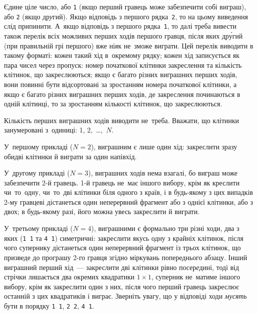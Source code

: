 \OutputFile

Єдине ціле число, або \texttt{1} (якщо перший гравець може забезпечити собі виграш), або \texttt{2} (якщо др{\it у}гий).
Якщо відповідь з першого рядка~\texttt{2}, то на цьому виведення слід припинити. А~якщо відповідь з першого рядка~\texttt{1}, то далі треба вивести також перелік всіх можливих перших ходів першого гравця, після яких др\'{у}гий (при правильній грі першого) вже ні{\it я}к не~зможе виграти. Цей перелік виводити в такому форматі: кожен такий хід в~окремому рядку; кожен хід записується як пара чисел через пропуск: номер початкової клітинки закреслення та кількість клітинок, що закреслюються; якщо є багато різних виграшних перших ходів, вони повинні бути відсортовані за зростанням номера початкової клітинки, а якщо є багато різних виграшних перших ходів, де закреслення починаються в одній клітинці, то за зростанням кількості клітинок, що закреслюються.

Кількість перших виграшних ходів виводити не~треба.
Вважати, що клітинки занумеровані з~одиниці: 1, 2,~\dots,~$N$.


\Examples

\begin{example}
\end{example}


\Note

У~першому прикладі ($N{=}2$), виграшним є лише один хід: закреслити зразу обидві клітинки й виграти за один напівхід.

У~др{\it у}гому прикладі ($N{=}3$), виграшних ходів нема взагалі, бо виграш може забезпечити 2-й гравець. 1-й гравець не~має іншого вибору, крім як креслити чи~то~одну, чи~то~дві клітинки біля одного з країв, і в будь-якому з цих випадків 2-му гравцеві дістанеться один неперервний фрагмент або з однієї клітинки, або з двох; в будь-якому разі, його можна увесь закреслити й виграти.

У~третьому прикладі ($N{=}4$), виграшними є формально три різні ходи, два з яких (\texttt{1~1} та \texttt{4~1}) симетричні: закреслити якусь одну з крайніх клітинок, після чого супернику дістанеться один неперервний фрагмент із трьох клітинок, що призведе до програшу 2-го гравця згідно міркувань попереднього абзацу. 
Інший виграшний перший хід~--- закреслити дві клітинки рівно посер{\it е}дині, тоді від стрічки лишається два окремих квадратики $1{\times}1$, суперник не~матиме іншого вибору, крім як закреслити один з них, після чого перший гравець закреслює останній з цих квадратиків і виграє. Зверніть увагу, що у відповіді ходи {\it мусять} бути в порядку \texttt{1~1}, \texttt{2~2}, \texttt{4~1}.












